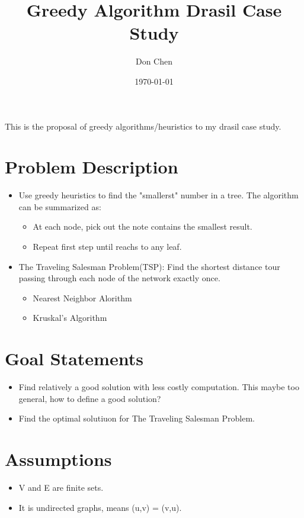 \documentclass[12pt]{article}
\title{Greedy Algorithm Drasil Case Study}
\author{Don Chen}
\date{\today}
\begin{document}
\maketitle
This is the proposal of greedy algorithms/heuristics to my drasil case study.

\section{Problem Description}
\begin{itemize}
    \item Use greedy heuristics to find the "smallerst" number in a tree. 
    The algorithm can be summarized as:
    \begin{itemize}
        \item At each node, pick out the note contains the smallest result.
        \item Repeat first step until reachs to any leaf.
    \end{itemize}
    \item The Traveling Salesman Problem(TSP): 
    Find the shortest distance tour passing through each node of the network exactly once. 
    \begin{itemize}
        \item Nearest Neighbor Alorithm
        \item Kruskal’s Algorithm
    \end{itemize}
\end{itemize}

\section{Goal Statements}

\begin{itemize}
    \item Find relatively a good solution with less costly computation. 
    This maybe too general, how to define a good solution?
    \item Find the optimal solutiuon for The Traveling Salesman Problem.
\end{itemize}

\section{Assumptions}

\begin{itemize}
    \item V and E are finite sets. 
    \item It is undirected graphs, means (u,v) = (v,u).
\end{itemize}
\end{document}
